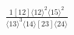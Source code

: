 \documentclass[varwidth, border=5pt]{standalone}
\begin{document}
\begin{my}
$\begin{gathered}
\scriptscriptstyle\frac{1[12]⟨12⟩^2⟨15⟩^2}{⟨13⟩^3⟨14⟩[23]⟨24⟩}
\end{gathered}$
\end{my}
\end{document}
